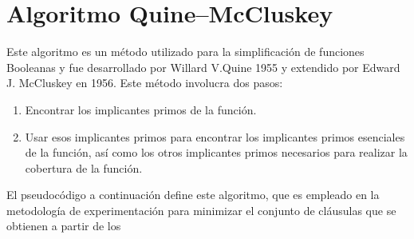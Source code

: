 \section{Algoritmo Quine–McCluskey}

Este algoritmo es un método utilizado para la simplificación de funciones Booleanas y fue desarrollado por Willard V.Quine 1955 y extendido por Edward J. McCluskey en 1956. Este método involucra dos pasos:
\begin{enumerate}
	\item Encontrar los implicantes primos de la función.
	\item Usar esos implicantes primos para encontrar los implicantes primos esenciales de la función, así como los otros implicantes primos necesarios para realizar la cobertura de la función.
\end{enumerate}

El pseudocódigo a continuación define este algoritmo, que es empleado en la metodología de experimentación para minimizar el conjunto de cláusulas que se obtienen a partir de los 

\begin{algorithm}
	\SetAlgoLined
\end{algorithm}


